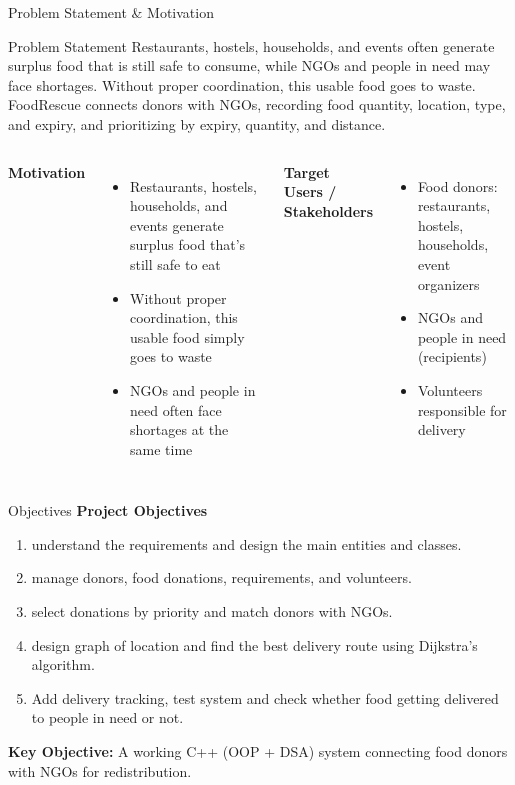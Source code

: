 \documentclass[aspectratio=169,11pt]{beamer}
\begin{document}
\begin{frame}{Problem Statement \& Motivation}
\begin{block}{Problem Statement}
\footnotesize Restaurants, hostels, households, and events often generate surplus food that is still safe to consume, while NGOs and people in need may face shortages. Without proper coordination, this usable food goes to waste. FoodRescue connects donors with NGOs, recording food quantity, location, type, and expiry, and prioritizing by expiry, quantity, and distance.
\end{block}
\vspace{1mm}
\begin{columns}[T,totalwidth=\textwidth]
\footnotesize
\textbf{\color{GEUBlue}Motivation}
\begin{itemize}\itemsep1pt
\item Restaurants, hostels, households, and events generate surplus food that's still safe to eat
\item Without proper coordination, this usable food simply goes to waste
\item NGOs and people in need often face shortages at the same time
\end{itemize}
\footnotesize
\textbf{\color{GEUBlue}Target Users / Stakeholders}
\begin{itemize}\itemsep1pt
\item Food donors: restaurants, hostels, households, event organizers
\item NGOs and people in need (recipients)
\item Volunteers responsible for delivery
\end{itemize}
\end{columns}
\end{frame}



\begin{frame}{Objectives}
\textbf{\color{GEUBlue}Project Objectives}
\vspace{2mm}
\begin{enumerate}\itemsep5pt
\item understand the requirements and design the main entities and classes.
\item manage donors, food donations, requirements, and volunteers.
\item select donations by priority and match donors with NGOs.
\item design graph of location and find the best delivery route using Dijkstra's algorithm.
\item Add delivery tracking, test system and check whether food getting delivered to people in need or not.
\end{enumerate}
\vfill
\begin{center}
\colorbox{GEULightBlue}{\parbox{.80\textwidth}{\centering
\textbf{Key Objective:} A working C++ (OOP + DSA) system connecting food donors with NGOs for redistribution.}}
\end{center}
\end{frame}
\end{document}
